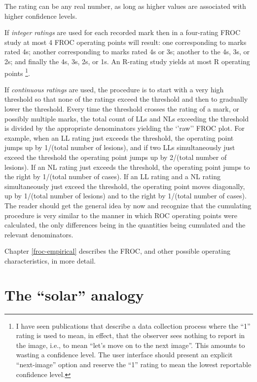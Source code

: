 \documentclass[
]{book}
\begin{document}
The rating can be any real number, as long as higher values are associated with higher confidence levels.

If \emph{integer ratings} are used for each recorded mark then in a four-rating FROC study at most 4 FROC operating points will result: one corresponding to marks rated 4s; another corresponding to marks rated 4s or 3s; another to the 4s, 3s, or 2s; and finally the 4s, 3s, 2s, or 1s. An R-rating study yields at most R operating points \footnote{I have seen publications that describe a data collection process where the ``1'' rating is used to mean, in effect, that the observer sees nothing to report in the image, i.e., to mean ``let's move on to the next image''. This amounts to wasting a confidence level. The user interface should present an explicit ``next-image'' option and reserve the ``1'' rating to mean the lowest reportable confidence level.}.

If \emph{continuous ratings} are used, the procedure is to start with a very high threshold so that none of the ratings exceed the threshold and then to gradually lower the threshold. Every time the threshold crosses the rating of a mark, or possibly multiple marks, the total count of LLs and NLs exceeding the threshold is divided by the appropriate denominators yielding the `'raw'' FROC plot. For example, when an LL rating just exceeds the threshold, the operating point jumps up by 1/(total number of lesions), and if two LLs simultaneously just exceed the threshold the operating point jumps up by 2/(total number of lesions). If an NL rating just exceeds the threshold, the operating point jumps to the right by 1/(total number of cases). If an LL rating and a NL rating simultaneously just exceed the threshold, the operating point moves diagonally, up by 1/(total number of lesions) and to the right by 1/(total number of cases). The reader should get the general idea by now and recognize that the cumulating procedure is very similar to the manner in which ROC operating points were calculated, the only differences being in the quantities being cumulated and the relevant denominators.

Chapter \ref{froc-empirical} describes the FROC, and other possible operating characteristics, in more detail.

\hypertarget{froc-paradigm-solar-analogy}{%
\section{The ``solar'' analogy}\label{froc-paradigm-solar-analogy}}
\end{document}

